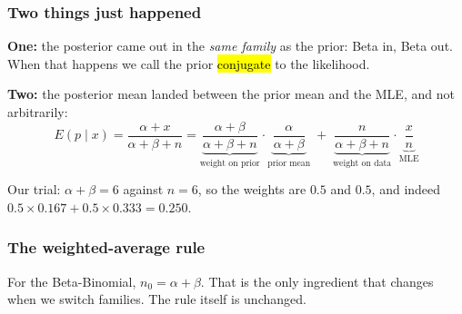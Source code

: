 \documentclass[slidestop,compress,mathserif]{beamer}
\begin{document}
\begin{frame}
\frametitle{Two things just happened}

\textbf{One:} the posterior came out in the \emph{same family} as the prior: Beta in, Beta out. When that happens we call the prior \hl{conjugate} to the likelihood.

\pause
\medskip

\textbf{Two:} the posterior mean landed between the prior mean and the MLE, and not arbitrarily:
\vspace{-0.2em}
\[
E(p \mid x) = \frac{\alpha + x}{\alpha + \beta + n}
= \underbrace{\frac{\alpha + \beta}{\alpha + \beta + n}}_{\text{weight on prior}} \cdot \underbrace{\frac{\alpha}{\alpha+\beta}}_{\text{prior mean}}
\;+\; \underbrace{\frac{n}{\alpha + \beta + n}}_{\text{weight on data}} \cdot \underbrace{\frac{x}{n}}_{\text{MLE}}
\]
\pause
\vspace{-0.2em}

Our trial: $\alpha+\beta = 6$ against $n = 6$, so the weights are $0.5$ and $0.5$, and indeed $0.5 \times 0.167 + 0.5 \times 0.333 = 0.250$.

\end{frame}

\begin{frame}
\frametitle{The weighted-average rule}


\pause
\medskip

For the Beta-Binomial, $n_0 = \alpha + \beta$. That is the only ingredient that changes when we switch families. The rule itself is unchanged.

\end{frame}
\end{document}
